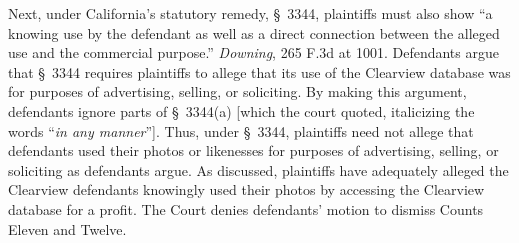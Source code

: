 Next, under California's statutory remedy, \S~3344, plaintiffs must 
also show ``a knowing use by the defendant as well as a direct connection
between the alleged use and the commercial purpose.'' \textit{Downing}, 265 F.3d
at 1001.
Defendants argue that \S~3344 requires plaintiffs to allege that its use
of the Clearview database was for purposes of advertising, selling, or 
soliciting. By making this argument, defendants ignore parts of \S~3344(a)
[which the court quoted, italicizing the words ``\emph{in any
manner}''].
Thus, under \S~3344, plaintiffs need not 
allege that defendants used their photos or likenesses for purposes of 
advertising, selling, or soliciting as defendants argue. As discussed, 
plaintiffs have adequately alleged the Clearview defendants knowingly 
used their photos by accessing the Clearview database for a profit. The 
Court denies defendants' motion to dismiss Counts Eleven and Twelve.

%
%


